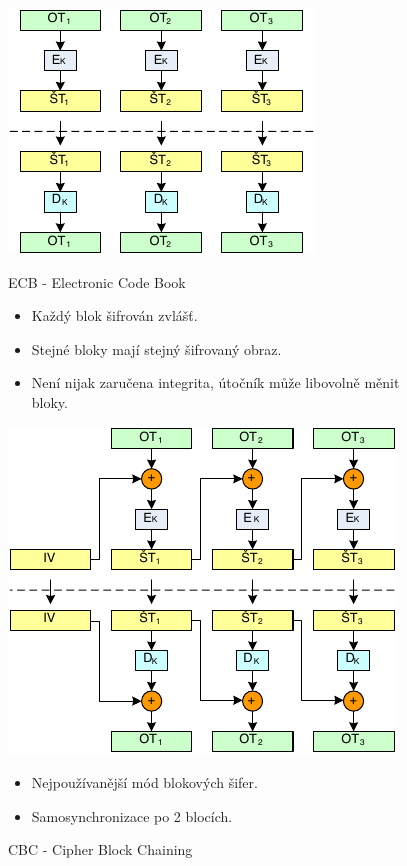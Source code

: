 \documentclass{szzclass}
\begin{document}
\begin{figure}[ht!]
\centering
\begin{minipage}{.5\textwidth}
  \centering
  \includegraphics[width=.75\linewidth]{topics/bi-spol-07/images/ecb}
  \caption{ECB - Electronic Code Book}
  \begin{itemize}
    \item Každý blok šifrován zvlášť.
    \item Stejné bloky mají stejný šifrovaný obraz.
    \item Není nijak zaručena integrita, útočník může libovolně měnit bloky.
  \end{itemize}
\end{minipage}%
\begin{minipage}{.5\textwidth}
  \centering
  \includegraphics[width=.75\linewidth]{topics/bi-spol-07/images/cbc}
  \caption{CBC - Cipher Block Chaining}
  \begin{itemize}
    \item Nejpoužívanější mód blokových šifer.
    \item Samosynchronizace po 2 blocích.
  \end{itemize}
\end{minipage}
\end{figure}
\end{document}
